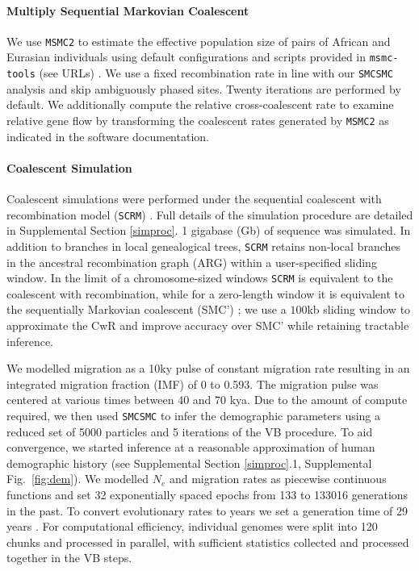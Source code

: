 \paragraph{Multiply Sequential Markovian Coalescent} We use {\tt MSMC2} to estimate the effective population size of pairs of African and Eurasian individuals using default configurations and scripts provided in {\tt msmc-tools} (see URLs) \cite{Schiffels2014, Wang2019a}. We use a fixed recombination rate in line with our {\tt SMCSMC} analysis and skip ambiguously phased sites. Twenty iterations are performed by default. We additionally compute the relative cross-coalescent rate to examine relative gene flow by transforming the coalescent rates generated by {\tt MSMC2} as indicated in the software documentation.

\paragraph{Coalescent Simulation} Coalescent simulations were performed under the sequential coalescent with recombination model ({\tt SCRM}) \cite{Staab2015}. Full details of the simulation procedure are detailed in Supplemental Section \ref{simproc}. 1 gigabase (Gb) of sequence was simulated.  In addition to branches in local genealogical trees, {\tt SCRM} retains non-local branches in the ancestral recombination graph (ARG) within a user-specified sliding window.  In the limit of a chromosome-sized windows {\tt SCRM} is equivalent to the coalescent with recombination, while for a zero-length window it is equivalent to the sequentially Markovian coalescent (SMC') \cite{McVean2005,Marjoram2006}; we use a $100$kb sliding window to approximate the CwR and improve accuracy over SMC' while retaining tractable inference.

We modelled migration as a 10ky pulse of constant migration rate resulting in an integrated migration fraction (IMF) of 0 to 0.593. The migration pulse was centered at various times between 40 and 70 kya.  Due to the amount of compute required, we then used {\tt SMCSMC} to infer the demographic parameters using a reduced set of 5000 particles and 5 iterations of the VB procedure. To aid convergence, we started inference at a reasonable approximation of human demographic history (see Supplemental Section \ref{simproc}.1, Supplemental Fig.\ \ref{fig:dem}). We modelled $N_e$ and migration rates as piecewise continuous functions and set 32 exponentially spaced epochs from 133 to 133016 generations in the past. To convert evolutionary rates to years we set a generation time of 29 years \cite{Fenner2005}.  For computational efficiency, individual genomes were split into 120 chunks and processed in parallel, with sufficient statistics collected and processed together in the VB steps.

